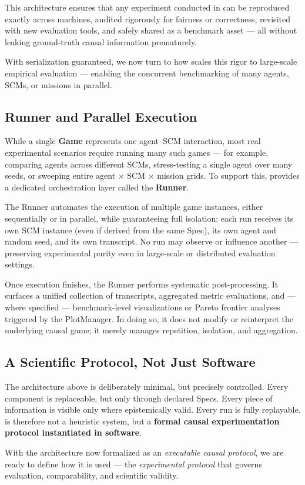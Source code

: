 This architecture ensures that any experiment conducted in \game can be reproduced exactly across machines, audited rigorously for fairness or correctness, revisited with new evaluation tools, and safely shared as a benchmark asset — all without leaking ground-truth causal information prematurely.

With serialization guaranteed, we now turn to how \game scales this rigor to large-scale empirical evaluation — enabling the concurrent benchmarking of many agents, SCMs, or missions in parallel.

\subsection{Runner and Parallel Execution}
\label{sec:runner}
While a single \textbf{Game} represents one agent–SCM interaction, most real experimental scenarios require running many such games — for example, comparing agents across different SCMs, stress-testing a single agent over many seeds, or sweeping entire agent × SCM × mission grids. To support this, \game provides a dedicated orchestration layer called the \textbf{Runner}.

The Runner automates the execution of multiple game instances, either sequentially or in parallel, while guaranteeing full isolation: each run receives its own SCM instance (even if derived from the same Spec), its own agent and random seed, and its own transcript. No run may observe or influence another — preserving experimental purity even in large-scale or distributed evaluation settings.

Once execution finishes, the Runner performs systematic post-processing. It surfaces a unified collection of transcripts, aggregated metric evaluations, and — where specified — benchmark-level visualizations or Pareto frontier analyses triggered by the PlotManager. In doing so, it does not modify or reinterpret the underlying causal game; it merely manages repetition, isolation, and aggregation.

\subsection{A Scientific Protocol, Not Just Software}

The architecture above is deliberately minimal, but precisely controlled.  
Every component is replaceable, but only through declared Specs.  
Every piece of information is visible only where epistemically valid.  
Every run is fully replayable.  
\game is therefore not a heuristic system, but a \textbf{formal causal experimentation protocol instantiated in software}.

\medskip
With the architecture now formalized as an \emph{executable causal protocol}, we are ready to define how it is used — the \emph{experimental protocol} that governs evaluation, comparability, and scientific validity.
